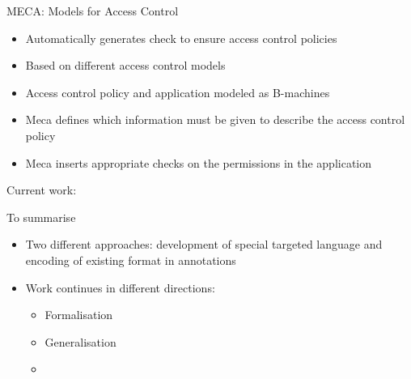 \documentclass[final,nocolorBG,a4,marieke,nototal,ps, accumulate,slideColor]{prosper}
\begin{document}
\begin{slide}{MECA: Models for Access Control}
\begin{itemize}
\item Automatically generates check to ensure access control policies
\item Based on different access control models
\item Access control policy and application modeled as B-machines
\item Meca defines which information must be given to describe the
access control policy
\item Meca inserts appropriate checks on the permissions in the application
\end{itemize}
\end{slide}

\begin{slide}{Current work: }
\end{slide}

\begin{slide}{To summarise}
\begin{itemize}
\item Two different approaches: development of special targeted
language and encoding of existing format in annotations
\item Work continues in different directions:
\begin{itemize}
\item Formalisation
\item Generalisation
\item 
\end{itemize}
\end{itemize}
\end{slide}
\end{document}

